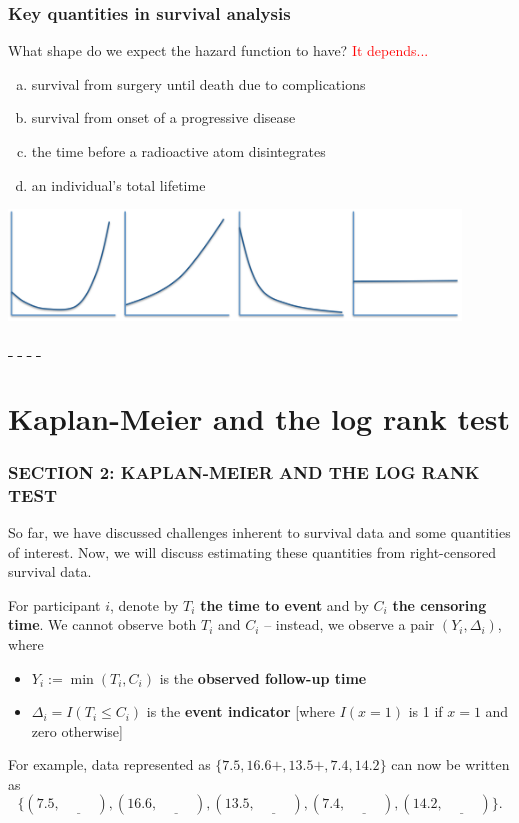 \documentclass[12pt, 
hyperref={colorlinks=true, linkcolor=blue, urlcolor=cyan},dvipsnames]{beamer}
\begin{document}
\begin{frame}
\frametitle{Key quantities in survival analysis}
What shape do we expect the hazard function to have? \textcolor{red}{It depends...}
\begin{enumerate}[(a)]
\item survival from surgery until death due to complications
\item survival from onset of a progressive disease
\item the time before a radioactive atom disintegrates
\item an individual's total lifetime
\end{enumerate}
\begin{center}
\includegraphics[width = 0.9\textwidth]{figs/hazard_examples.png}

\underline{\,\phantom{right}\,} \hspace{1.5cm} \underline{\,\phantom{right}\,} \hspace{1.5cm} \underline{\,\phantom{right}\,} \hspace{1.5cm} \underline{\,\phantom{right}\,}
\end{center}
\end{frame}

\section{Kaplan-Meier and the log rank test}
\begin{frame}
\frametitle{SECTION 2: KAPLAN-MEIER AND THE LOG RANK TEST}

So far, we have discussed challenges inherent to survival data and some quantities of interest. Now, we will discuss estimating these quantities from right-censored survival data.

For participant $i$, denote by $T_i$ \textbf{the time to event} and by $C_i$ \textbf{the censoring time}. We cannot observe both $T_i$ and $C_i$ -- instead, we observe a pair $(Y_i, \Delta_i)$, where \vspace{-0.3cm}
\begin{itemize}
\item $Y_i := \min(T_i, C_i)$ is the \textbf{observed follow-up time}
\item $\Delta_i = I(T_i \leq C_i)$ is the \textbf{event indicator} [where $I(x = 1)$ is 1 if $x = 1$ and zero otherwise]
\end{itemize}

For example, data represented as $\{7.5, 16.6+, 13.5+, 7.4, 14.2\}$ can now be written as
\[\{(7.5, \underline{\,\phantom{right}\,}), (16.6, \underline{\,\phantom{right}\,}), (13.5, \underline{\,\phantom{right}\,}), (7.4, \underline{\,\phantom{right}\,}), (14.2, \underline{\,\phantom{right}\,})\}.\]
\end{frame}
\end{document}
